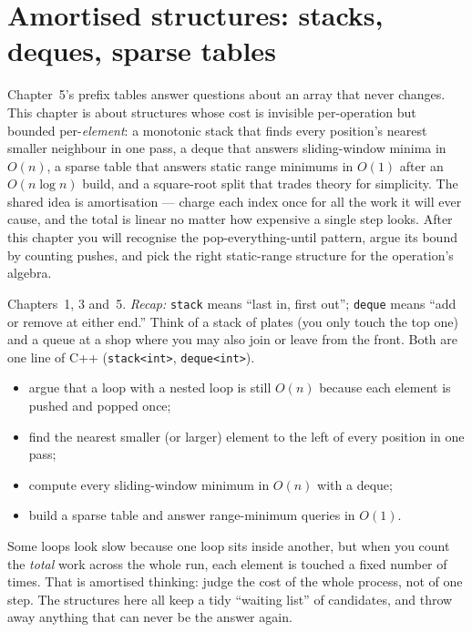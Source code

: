 \chapter{Amortised structures: stacks, deques, sparse tables}\label{ch:amort}

Chapter~5's prefix tables answer questions about an array that never
changes. This chapter is about structures whose cost is invisible
per-operation but bounded per-\emph{element}: a monotonic stack that
finds every position's nearest smaller neighbour in one pass, a deque
that answers sliding-window minima in $O(n)$, a sparse table that
answers static range minimums in $O(1)$ after an $O(n \log n)$ build,
and a square-root split that trades theory for simplicity. The shared
idea is amortisation --- charge each index once for all the work it
will ever cause, and the total is linear no matter how expensive a
single step looks. After this chapter you will recognise the
pop-everything-until pattern, argue its bound by counting pushes, and
pick the right static-range structure for the operation's algebra.

\begin{rulebox}
Chapters~1, 3 and~5. \emph{Recap:} \texttt{stack} means ``last in, first out''; \texttt{deque} means ``add or remove at either end.'' Think of a stack of plates (you only touch the top one) and a queue at a shop where you may also join or leave from the front. Both are one line of C++ (\texttt{stack<int>}, \texttt{deque<int>}).
\end{rulebox}
\begin{wins}
\begin{itemize}
\item argue that a loop with a nested loop is still $O(n)$ because each element is pushed and popped once;
\item find the nearest smaller (or larger) element to the left of every position in one pass;
\item compute every sliding-window minimum in $O(n)$ with a deque;
\item build a sparse table and answer range-minimum queries in $O(1)$.
\end{itemize}
\end{wins}
\begin{principle}
Some loops look slow because one loop sits inside another, but when you count the \emph{total} work across the whole run, each element is touched a fixed number of times. That is amortised thinking: judge the cost of the whole process, not of one step. The structures here all keep a tidy ``waiting list'' of candidates, and throw away anything that can never be the answer again.
\end{principle}

